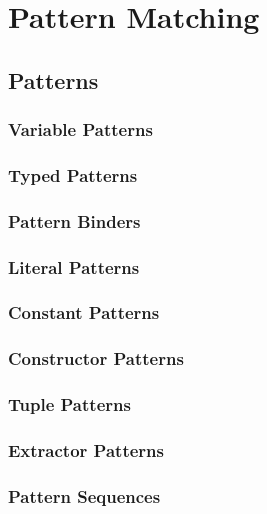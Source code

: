 
\chapter{Pattern Matching}
\label{sec:pattern-matching}

\section{Patterns}
\label{sec:patterns}

\subsection{Variable Patterns}

\subsection{Typed Patterns}

\subsection{Pattern Binders}

\subsection{Literal Patterns}

\subsection{Constant Patterns}
\label{sec:constant-patterns}

\subsection{Constructor Patterns}
\label{sec:constructor-patterns}

\subsection{Tuple Patterns}

\subsection{Extractor Patterns}
\label{sec:extractor-patterns}

\subsection{Pattern Sequences}

